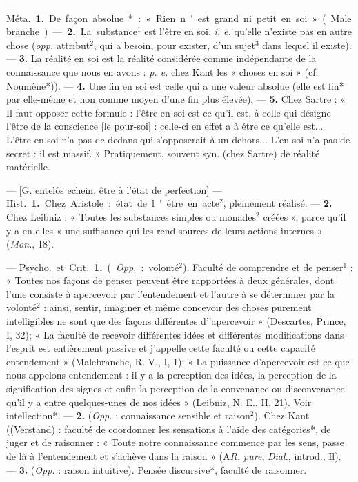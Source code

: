 \begin{itemize}[leftmargin=1cm, label=, itemsep=1pt]
 — \si{Méta.} {\bf 1.} De façon absolue* :
« Rien n'est grand ni petit en soi »
(Malebranche). — {\bf 2.} La substance$^1$
est l'être en soi, {\it i. e.} qu’elle n'existe
pas en autre chose ({\it opp.} attribut$^2$,
qui a besoin, pour exister, d’un
sujet$^3$ dans lequel il existe). — {\bf 3.}
La réalité en soi est la réalité considérée comme indépendante de la
connaissance que nous en avons :
{\it p. e.} chez Kant les « choses en soi »
(cf. Noumène*)). — {\bf 4.} Une fin en soi
est celle qui a une valeur absolue
(elle est fin* par elle-même et non
comme moyen d’une fin plus élevée).
— {\bf 5.} Chez Sartre : « Il faut opposer
cette formule : l'être en soi est ce
qu’il est, à celle qui désigne l'être
de la conscience [le pour-soi] : celle-ci
en effet a à étre ce qu’elle est... L'être-en-soi n’a pas de dedans qui s’opposerait à un dehors... L'en-soi n’a pas
de secret : il est massif. » Pratiquement, souvent syn. (chez Sartre) de
réalité matérielle.

 — [G. entelôs echein, être à
l'état de perfection] — \si{Hist.} {\bf 1.}
Chez Aristole : état de l'être en
acte$^2$, pleinement réalisé. — {\bf 2.} Chez
Leibniz : « Toutes les substances
simples ou monades$^2$ créées », parce
qu’il y a en elles « une suffisance
qui les rend sources de leurs actions
internes » ({\it Mon.}, 18).

 — \si{Psycho.} et \si{Crit.} {\bf 1.}
({\it Opp.} : volonté$^2$). Faculté de comprendre et de penser$^1$ : « Toutes nos
façons de penser peuvent être rapportées à deux générales, dont l’une
consiste à apercevoir par l’entendement et l’autre à se déterminer par
la volonté$^2$ : ainsi, sentir, imaginer
et même concevoir des choses purement intelligibles ne sont que des
façons différentes d’'apercevoir »
(Descartes, Prince, I, 32); « La
faculté de recevoir différentes idées
et différentes modifications dans
l'esprit est entièrement passive et
j'appelle cette faculté ou cette capacité entendement » (Malebranche,
R. V., I, 1); « La puissance d’apercevoir est ce que nous appelons
entendement : il y a la perception
des idées, la perception de la signification des signes et enfin la perception de la convenance ou disconvenance qu'il y a entre quelques-unes de nos idées » (Leibniz, N. E.,
II, 21). Voir intellection*. — {\bf 2.}
({\it Opp.} : connaissance sensible et
raison$^2$). Chez Kant ((Verstand) :
faculté de coordonner les sensations à l’aide des catégories*, de
juger et de raisonner : « Toute notre
connaissance commence par les sens,
passe de là à l’entendement et
s'achève dans la raison » (A{\it R. pure},
{\it Dial.}, introd., Il). — {\bf 3.} ({\it Opp.} :
raison intuitive). Pensée discursive*,
faculté de raisonner.


\end{itemize}
